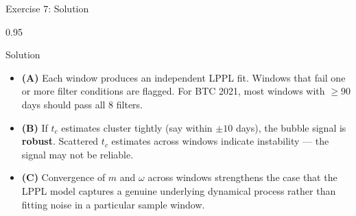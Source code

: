 \documentclass[9pt, aspectratio=169, t]{beamer}
\begin{document}
\begin{frame}{Exercise 7: Solution}
    \begin{cminipage}{0.95\textwidth}
    \begin{exampleblock}{Solution}
        {\small
        \begin{itemize}\setlength{\itemsep}{3pt}
            \item \textcolor{MainBlue}{\textbf{(A)}} Each window produces an independent LPPL fit. Windows that fail one or more filter conditions are flagged. For BTC 2021, most windows with $\geq 90$ days should pass all 8 filters.
            \item \textcolor{MainBlue}{\textbf{(B)}} If $t_c$ estimates cluster tightly (say within $\pm 10$ days), the bubble signal is \textbf{robust}. Scattered $t_c$ estimates across windows indicate instability --- the signal may not be reliable.
            \item \textcolor{MainBlue}{\textbf{(C)}} Convergence of $m$ and $\omega$ across windows strengthens the case that the LPPL model captures a genuine underlying dynamical process rather than fitting noise in a particular sample window.
        \end{itemize}
        }
    \end{exampleblock}
    \end{cminipage}
\end{frame}
\end{document}
